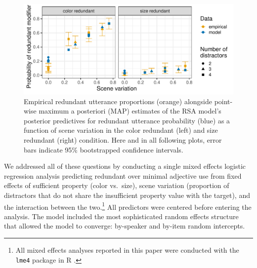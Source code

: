 \documentclass[11pt]{article}
\begin{document}
\begin{figure}
\centering
\includegraphics[width=.8\textwidth]{pics/exp1-empirical-predictives}
\caption{Empirical redundant utterance proportions  (orange)  alongside point-wise maximum a posteriori (MAP) estimates of the RSA model's posterior predictives for redundant utterance probability (blue) as a function of scene variation in the color redundant (left) and size redundant (right) condition. Here and in all following plots, error bars indicate 95\% bootstrapped confidence intervals.}
\label{fig:exp1results}
\end{figure}

We addressed all of these questions by conducting a single mixed effects logistic regression analysis predicting redundant over minimal adjective use from fixed effects of sufficient property (color vs.~size), scene variation (proportion of distractors that do not share the insufficient property value with the target), and the interaction between the two.\footnote{All mixed effects analyses reported in this paper were conducted with the \verb+lme4+ package \cite{lme4} in R \cite{R}.} All predictors were centered before entering the analysis. The model included the most sophisticated random effects structure that allowed the model to converge: by-speaker and by-item random intercepts.
\end{document}
